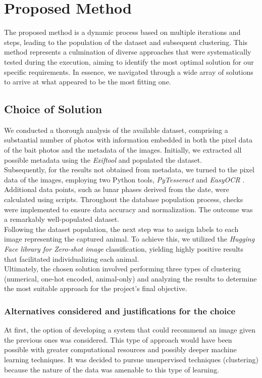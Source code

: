 \documentclass[12pt,a4paper,twoside]{article}
\begin{document}
\newpage

\section{Proposed Method}
The proposed method is a dynamic process based on multiple iterations and steps, leading to the population of the dataset and subsequent clustering. This method represents a culmination of diverse approaches that were systematically tested during the execution, aiming to identify the most optimal solution for our specific requirements. In essence, we navigated through a wide array of solutions to arrive at what appeared to be the most fitting one.

\subsection{Choice of Solution}
We conducted a thorough analysis of the available dataset, comprising a substantial number of photos with information embedded in both the pixel data of the bait photos and the metadata of the images. Initially, we extracted all possible metadata using the \textit{Exiftool} \cite{exiftool} and populated the dataset.\\
Subsequently, for the results not obtained from metadata, we turned to the pixel data of the images, employing two Python tools, \textit{PyTesseract} \cite{pytesseract} and \textit{EasyOCR} \cite{easyocr}. Additional data points, such as lunar phases derived from the date, were calculated using scripts. Throughout the database population process, checks were implemented to ensure data accuracy and normalization. The outcome was a remarkably well-populated dataset. \\
Following the dataset population, the next step was to assign labels to each image representing the captured animal. To achieve this, we utilized the \textit{Hugging Face library for Zero-shot image} \cite{huggingface} classification, yielding highly positive results that facilitated individualizing each animal. \\
Ultimately, the chosen solution involved performing three types of clustering (numerical, one-hot encoded, animal-only) and analyzing the results to determine the most suitable approach for the project's final objective.

\subsubsection{Alternatives considered and justifications for the choice}
At first, the option of developing a system that could recommend an image given the previous ones was considered. This type of approach would have been possible with greater computational resources and possibly deeper machine learning techniques. It was decided to pursue unsupervised techniques (clustering) because the nature of the data was amenable to this type of learning.  
\end{document}
